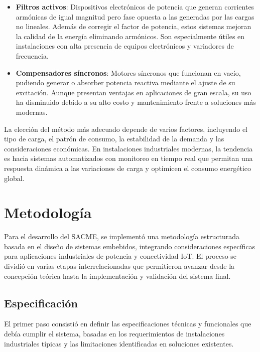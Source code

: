 \documentclass{report}          %
\newcommand{\shortname}     {SACME}
\begin{document}
\begin{itemize}
                    \item \textbf{Filtros activos}: Dispositivos electrónicos de potencia que generan corrientes armónicas de igual magnitud pero fase opuesta a las generadas por las cargas no lineales. Además de corregir el factor de potencia, estos sistemas mejoran la calidad de la energía eliminando armónicos. Son especialmente útiles en instalaciones con alta presencia de equipos electrónicos y variadores de frecuencia.
                    
                    \item \textbf{Compensadores síncronos}: Motores síncronos que funcionan en vacío, pudiendo generar o absorber potencia reactiva mediante el ajuste de su excitación. Aunque presentan ventajas en aplicaciones de gran escala, su uso ha disminuido debido a su alto costo y mantenimiento frente a soluciones más modernas.
                \end{itemize}

                La elección del método más adecuado depende de varios factores, incluyendo el tipo de carga, el patrón de consumo, la estabilidad de la demanda y las consideraciones económicas. En instalaciones industriales modernas, la tendencia es hacia sistemas automatizados con monitoreo en tiempo real que permitan una respuesta dinámica a las variaciones de carga y optimicen el consumo energético global.
        
    \chapter{Metodología}
        Para el desarrollo del \shortname, se implementó una metodología estructurada basada en el diseño de sistemas embebidos, integrando consideraciones específicas para aplicaciones industriales de potencia y conectividad IoT. El proceso se dividió en varias etapas interrelacionadas que permitieron avanzar desde la concepción teórica hasta la implementación y validación del sistema final.
        \section{Especificación}
            El primer paso consistió en definir las especificaciones técnicas y funcionales que debía cumplir el sistema, basadas en los requerimientos de instalaciones industriales típicas y las limitaciones identificadas en soluciones existentes.
        
\end{document}

